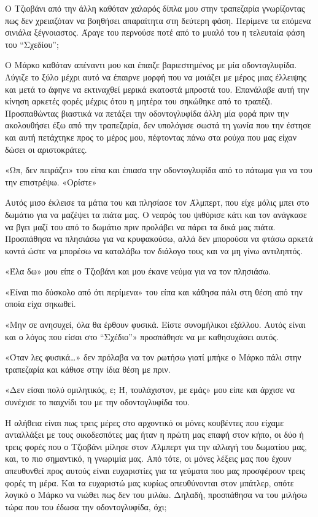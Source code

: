 \documentclass[12pt,twoside, openany]{book}
\begin{document}
Ο Τζιοβάνι από την άλλη καθόταν χαλαρός δίπλα μου στην τραπεζαρία γνωρίζοντας πως δεν χρειαζόταν να βοηθήσει απαραίτητα στη δεύτερη φάση. Περίμενε τα επόμενα σινιάλα ξέγνοιαστος. Άραγε του περνούσε ποτέ από το μυαλό του η τελευταία φάση του “Σχεδίου”;

Ο Μάρκο καθόταν απέναντι μου και έπαιζε βαριεστημένος με μία οδοντογλυφίδα. Λύγιζε το ξύλο μέχρι αυτό να έπαιρνε μορφή που να μοιάζει με μέρος μιας έλλειψης και μετά το άφηνε να εκτιναχθεί μερικά εκατοστά μπροστά του. Επανάλαβε αυτή την κίνηση αρκετές φορές μέχρις ότου η μητέρα του σηκώθηκε από το τραπέζι. Προσπαθώντας βιαστικά να πετάξει την οδοντογλυφίδα άλλη μία φορά πριν την ακολουθήσει έξω από την τραπεζαρία, δεν υπολόγισε σωστά τη γωνία που την έστησε και αυτή πετάχτηκε προς το μέρος μου, πέφτοντας πάνω στα ρούχα που μας είχαν δώσει οι αριστοκράτες.

«Ωπ, δεν πειράζει» του είπα και έπιασα την οδοντογλυφίδα από το πάτωμα για να του την επιστρέψω. «Ορίστε»

Αυτός μισο έκλεισε τα μάτια του και πλησίασε τον Άλμπερτ, που είχε μόλις μπει στο δωμάτιο για να μαζέψει τα πιάτα μας. Ο νεαρός του ψιθύρισε κάτι και τον ανάγκασε να βγει μαζί του από το δωμάτιο πριν προλάβει να πάρει τα δικά μας πιάτα. Προσπάθησα να πλησιάσω για να κρυφακούσω, αλλά δεν μπορούσα να φτάσω αρκετά κοντά ώστε να μπορέσω να καταλάβω τον διάλογο τους και να μη γίνω αντιληπτός.

«Έλα δω» μου είπε ο Τζιοβάνι και μου έκανε νεύμα για να τον πλησιάσω.

«Είναι πιο δύσκολο από ότι περίμενα» του είπα και κάθησα πάλι στη θέση από την οποία είχα σηκωθεί.

«Μην σε ανησυχεί, όλα θα έρθουν φυσικά. Είστε συνομήλικοι εξάλλου. Αυτός είναι και ο λόγος που είσαι στο “Σχέδιο”» προσπάθησε να με καθησυχάσει αυτός.

«Όταν λες φυσικά…» δεν πρόλαβα να τον ρωτήσω γιατί μπήκε ο Μάρκο πάλι στην τραπεζαρία και κάθισε στην ίδια θέση με πριν.

«Δεν είσαι πολύ ομιλητικός, ε; Ή, τουλάχιστον, με εμάς» μου είπε και άρχισε να συνέχισε το παιχνίδι του με την οδοντογλυφίδα του.

Η αλήθεια είναι πως τρεις μέρες στο αρχοντικό οι μόνες κουβέντες που είχαμε ανταλλάξει με τους οικοδεσπότες μας ήταν η πρώτη μας επαφή στον κήπο, οι δύο ή τρεις φορές που ο Τζιοβάνι μίλησε στον Άλμπερτ για την αλλαγή του δωματίου μας, και, το πιο σημαντικό, η γνωριμία μας. Από τότε, οι μόνες λέξεις μας που έχουν απευθυνθεί προς αυτούς είναι ευχαριστίες για τα γεύματα που μας προσφέρουν τρεις φορές τη μέρα. Και τα ευχαριστώ μας κυρίως απευθύνονται στον μπάτλερ, οπότε λογικό ο Μάρκο να νιώθει πως δεν του μιλάω. Δηλαδή, προσπάθησα να του μιλήσω τώρα που του έδωσα την οδοντογλυφίδα, όχι;
\end{document}
